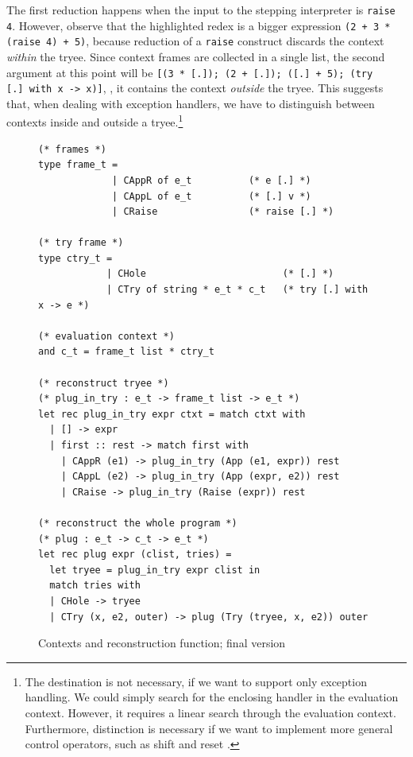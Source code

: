 \vspace{0.2cm}

\noindent The first reduction happens when the input to the stepping interpreter is \texttt{raise 4}.  However, observe that the highlighted redex is a bigger expression \texttt{(2 + 3 * (raise 4) + 5)}, because reduction of a \texttt{raise} construct discards the context \emph{within} the tryee.  Since context frames are collected in a single list, the second argument at this point will be \texttt{[(3 * [.]); (2 + [.]);\ ([.]\ + 5);\ (try [.]\ with x -> x)]}, \ie, it contains the context \emph{outside} the tryee.  This suggests that, when dealing with exception handlers, we have to distinguish between contexts inside and outside a tryee.\footnote{
The destination is not necessary,
if we want to support only exception handling.
We could simply search for the enclosing handler in the evaluation
context.
However, it requires a linear search through the evaluation context.
Furthermore, distinction is necessary if we want to implement
more general control operators,
such as shift and reset \cite{DF1990}.
}

\begin{figure}
\begin{verbatim}
(* frames *)
type frame_t = 
             | CAppR of e_t          (* e [.] *)
             | CAppL of e_t          (* [.] v *)
             | CRaise                (* raise [.] *)

(* try frame *)
type ctry_t = 
            | CHole                        (* [.] *)
            | CTry of string * e_t * c_t   (* try [.] with x -> e *)

(* evaluation context *)
and c_t = frame_t list * ctry_t

(* reconstruct tryee *)
(* plug_in_try : e_t -> frame_t list -> e_t *)
let rec plug_in_try expr ctxt = match ctxt with
  | [] -> expr
  | first :: rest -> match first with
    | CAppR (e1) -> plug_in_try (App (e1, expr)) rest
    | CAppL (e2) -> plug_in_try (App (expr, e2)) rest
    | CRaise -> plug_in_try (Raise (expr)) rest

(* reconstruct the whole program *)
(* plug : e_t -> c_t -> e_t *)
let rec plug expr (clist, tries) =
  let tryee = plug_in_try expr clist in
  match tries with
  | CHole -> tryee
  | CTry (x, e2, outer) -> plug (Try (tryee, x, e2)) outer
\end{verbatim}
  \caption{Contexts and reconstruction function; final version}
  \label{figure:typec}
\end{figure}


